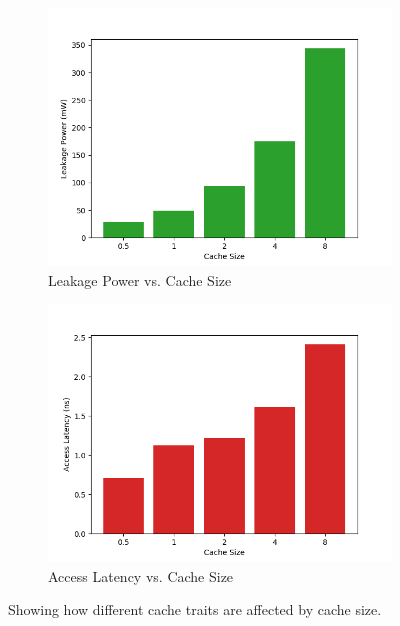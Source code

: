 \begin{figure}
\begin{subfigure}[b]{0.5\textwidth}
        \includegraphics[width=\textwidth]{CachePower.png}
        \caption{Leakage Power vs. Cache Size}
    \end{subfigure}
    \begin{subfigure}[b]{0.5\textwidth}
        \includegraphics[width=\textwidth]{CacheLatency.png}
        \caption{Access Latency vs. Cache Size}
    \end{subfigure}
    \caption{Showing how different cache traits are affected by cache size.}
    \label{fig:CacheSize}
\end{figure}
